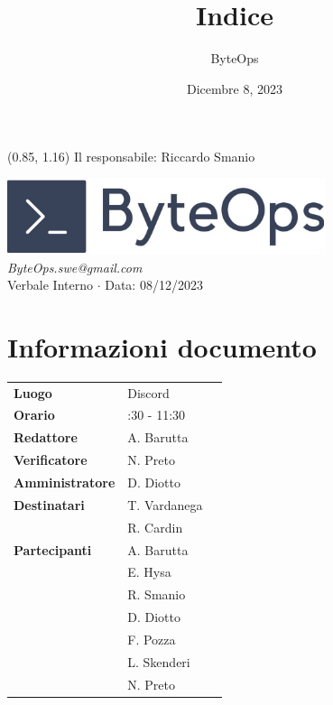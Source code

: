 \documentclass{article}
\title{\textbf{\fontsize{28}{6}\selectfont Indice}}
\author{\fontsize{14}{6}\selectfont ByteOps}
\date{Dicembre 8, 2023}
\begin{document}
\begin{textblock*}{\textwidth}(0.85\textwidth, 1.16\textheight)
    Il responsabile: Riccardo Smanio
\end{textblock*}

\pagestyle{fancy}
\begin{center}
\includegraphics[width = 0.7\textwidth]{../../../Images/logo.png} \\
\vspace{0.2cm}
\textcolor[RGB]{60, 60, 60}{\textit{ByteOps.swe@gmail.com}} \\
\vspace{1cm}
\fontsize{16}{6}\selectfont Verbale Interno $\cdot$ Data: 08/12/2023 \\
\vspace{0.5cm}
\end{center}

\section*{Informazioni documento}
\def\arraystretch{1.2}
\begin{tabular}{>{\raggedleft\arraybackslash}p{}|>{\raggedright\arraybackslash}p{}c}
\hline
\addlinespace
\textbf{Luogo} & Discord \vspace{10pt} \\
\textbf{Orario} & 10:30 - 11:30 \vspace{10pt} \\
\textbf{Redattore} & A. Barutta \vspace{10pt} \\
\textbf{Verificatore} & N. Preto \vspace{10pt} \\
\textbf{Amministratore} & D. Diotto \vspace{10pt} \\
\textbf{Destinatari} & T. Vardanega \\ & R. Cardin \vspace{10pt} \\
\textbf{Partecipanti} & A. Barutta \\ & E. Hysa \\ & R. Smanio \\ & D. Diotto \\ & F. Pozza \\ & L. Skenderi \\ & N. Preto \vspace{10pt} \\
\end{tabular}
\pagebreak 
\end{document}
